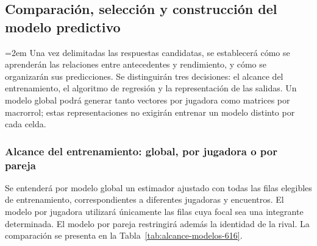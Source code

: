\subsection{Comparación, selección y construcción del modelo predictivo}
\label{subsec:construccion-modelo-fase1}
\begingroup
\emergencystretch=2em
Una vez delimitadas las respuestas candidatas, se establecerá cómo se aprenderán las relaciones entre antecedentes y rendimiento, y cómo se organizarán sus predicciones. Se distinguirán tres decisiones: el alcance del entrenamiento, el algoritmo de regresión y la representación de las salidas. Un modelo global podrá generar tanto vectores por jugadora como matrices por macrorrol; estas representaciones no exigirán entrenar un modelo distinto por cada celda.

\subsubsection*{Alcance del entrenamiento: global, por jugadora o por pareja}
Se entenderá por modelo global un estimador ajustado con todas las filas elegibles de entrenamiento, correspondientes a diferentes jugadoras y encuentros. El modelo por jugadora utilizará únicamente las filas cuya focal sea una integrante determinada. El modelo por pareja restringirá además la identidad de la rival. La comparación se presenta en la Tabla~\ref{tab:alcance-modelos-616}.


